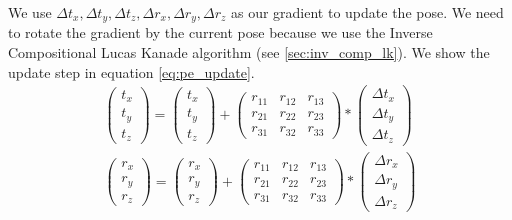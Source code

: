\documentclass[11pt,a4paper,titlepage,oneside]{report}
\begin{document}
We use $\Delta t_x,\Delta t_y,\Delta t_z,\Delta r_x,\Delta r_y,\Delta r_z$ as our gradient to update the pose. We need to rotate the gradient by the current pose because we use the Inverse Compositional Lucas Kanade algorithm (see \ref{sec:inv_comp_lk}). We show the update step in equation \ref{eq:pe_update}.
\begin{equation}\label{eq:pe_update}
  \begin{gathered}
    \begin{pmatrix}
      t_x\\
      t_y\\
      t_z
    \end{pmatrix}=
    \begin{pmatrix}
      t_x\\
      t_y\\
      t_z
    \end{pmatrix}+
    \begin{pmatrix}
      r_{11} & r_{12} & r_{13}\\
      r_{21} & r_{22} & r_{23}\\
      r_{31} & r_{32} & r_{33}
    \end{pmatrix}*
    \begin{pmatrix}
      \Delta t_x\\
      \Delta t_y\\
      \Delta t_z
    \end{pmatrix}\\
    \begin{pmatrix}
      r_x\\
      r_y\\
      r_z
    \end{pmatrix}=
    \begin{pmatrix}
      r_x\\
      r_y\\
      r_z
    \end{pmatrix}+
    \begin{pmatrix}
      r_{11} & r_{12} & r_{13}\\
      r_{21} & r_{22} & r_{23}\\
      r_{31} & r_{32} & r_{33}
    \end{pmatrix}*
    \begin{pmatrix}
      \Delta r_x\\
      \Delta r_y\\
      \Delta r_z
    \end{pmatrix}
  \end{gathered}
\end{equation}
\end{document}
